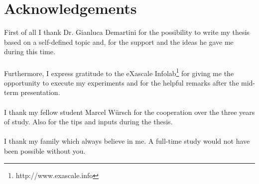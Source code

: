 \chapter*{Acknowledgements}
\thispagestyle{empty}
First of all I thank Dr. Gianluca Demartini for the possibility to write my thesis based on a self-defined topic and, for the support and the ideas he gave me during this time.\\\\
Furthermore, I express gratitude to the eXascale Infolab\footnote{http://www.exascale.info} for giving me the opportunity to execute my experiments and for the helpful remarks after the mid-term presentation.\\\\
I thank my fellow student Marcel W\"ursch for the cooperation over the three years of study. Also for the tips and inputs during the thesis.\\\\
I thank my family which always believe in me. A full-time study would not have been possible without you. 
\clearpage
